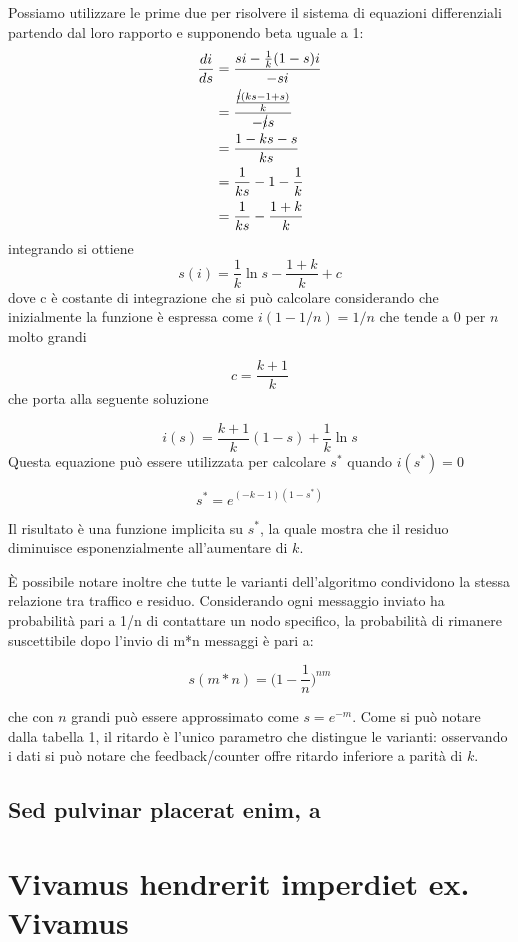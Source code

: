 Possiamo utilizzare le prime due per risolvere il sistema di equazioni differenziali partendo dal loro rapporto e supponendo beta uguale a 1:
\begin{equation}
    \begin{split}
        \frac{di}{ds}   & =  \frac{si - \frac{1}{k} (1-s) i}{-si} \\
        & = \frac{\frac{\cancel{i} (ks - 1 + s)}{k}}{- \cancel{i}s} \\
        & = \frac{1-ks-s}{ks} \\
        & = \frac{1}{ks} - 1 - \frac{1}{k} \\
        & = \frac{1}{ks} - \frac{1+k}{k} 
    \end{split}
\end{equation}
integrando si ottiene
\begin{equation}
    s(i) = \frac{1}{k} \ln s - \frac{1+k}{k} + c
\end{equation}
dove c è costante di integrazione che si può calcolare considerando che inizialmente la funzione è espressa come $i(1-1/n) = 1/n$ che tende a $0$ per $n$ molto grandi

\begin{equation}
    c = \frac{k+1}{k}
\end{equation}
che porta alla seguente soluzione

\begin{equation}
    i(s) = \frac{k+1}{k}(1-s) + \frac{1}{k} \ln s
\end{equation}
Questa equazione può essere utilizzata per calcolare $s^*$ quando $i(s^*) = 0$

\begin{equation}
    s^* = e^{(-k-1)(1-s^*)}
\end{equation}

Il risultato è una funzione implicita su $s^*$, la quale mostra che il residuo diminuisce esponenzialmente all'aumentare di $k$.

È possibile notare inoltre che tutte le varianti dell’algoritmo condividono la stessa relazione tra traffico e residuo. Considerando ogni messaggio inviato ha probabilità pari a 1/n di contattare un nodo specifico, la probabilità di rimanere suscettibile dopo l’invio di m*n messaggi è pari a:

\begin{equation}
    s(m*n) = \Big(1-\frac{1}{n}\Big)^{nm}
\end{equation}

che con $n$ grandi può essere approssimato come $s = e^{-m}$.
Come si può notare dalla tabella 1, il ritardo è l’unico parametro che distingue le varianti: osservando i dati si può notare che feedback/counter offre ritardo inferiore a parità di $k$.




\subsection{Sed pulvinar placerat enim, a}
\label{sec:00456}



\section{Vivamus hendrerit imperdiet ex. Vivamus}
\label{sec:123}



